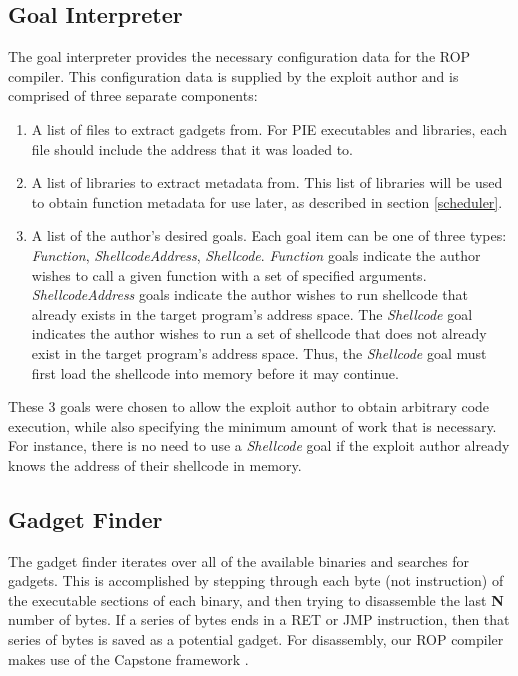 \documentclass[journal]{IEEEtran}
\begin{document}
\subsection{Goal Interpreter}
The goal interpreter provides the necessary configuration data for the ROP compiler.
This configuration data is supplied by the exploit author and is comprised of three separate components:
\begin{enumerate}
  \item A list of files to extract gadgets from.  For PIE executables and libraries, each file should include the address that it was loaded to.
  \item A list of libraries to extract metadata from.  This list of libraries will be used to obtain function metadata for use later, as described in section \ref{scheduler}.
  \item A list of the author's desired goals.  Each goal item can be one of three types: \emph{Function}, \emph{ShellcodeAddress}, \emph{Shellcode}.
  \emph{Function} goals indicate the author wishes to call a given function with a set of specified arguments.  
  \emph{ShellcodeAddress} goals indicate the author wishes to run shellcode that already exists in the target program's address space.
  The \emph{Shellcode} goal indicates the author wishes to run a set of shellcode that does not already exist in the target program's address space.
  Thus, the \emph{Shellcode} goal must first load the shellcode into memory before it may continue.
\end{enumerate}
These 3 goals were chosen to allow the exploit author to obtain arbitrary code execution, while also specifying the minimum amount of work that is necessary.
For instance, there is no need to use a \emph{Shellcode} goal if the exploit author already knows the address of their shellcode in memory.

\subsection{Gadget Finder}
The gadget finder iterates over all of the available binaries and searches for gadgets.
This is accomplished by stepping through each byte (not instruction) of the executable sections of each binary, and then trying to disassemble the last \textbf{N} number of bytes.
If a series of bytes ends in a RET or JMP instruction, then that series of bytes is saved as a potential gadget.
For disassembly, our ROP compiler makes use of the Capstone framework \cite{capstone}.
\end{document}
